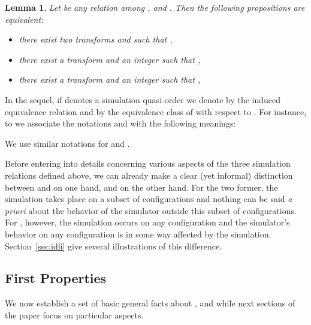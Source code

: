 \documentclass[a4paper]{elsarticle}
\def\qed{\relax\ifmmode\hskip2em \blacksquare\else\unskip\nobreak\hfill\hskip1em \fi}
\newtheorem{lm}{Lemma}[section]
\begin{document}
\begin{lm}
  \label{lem:mapa}
  Let  be any relation among ,  and . Then the following
  propositions are equivalent:
  \begin{itemize}
  \item there exist two  transforms  and  such that
    ,
  \item there exist a  transform  and an integer  such that
    ,
  \item there exist a  transform  and an integer  such that
    ,
  \end{itemize}
\end{lm}
\newcommand\trsfo[1]{\left\langle #1, 0\right\rangle}


In the sequel, if  denotes a simulation quasi-order we denote
by  the induced equivalence relation and by  the
equivalence class of  with respect to . For instance, to
 we associate the notations  and
 with the following meanings:

 We use similar notations for  and
.



Before entering into details concerning various aspects of the three
simulation relations defined above, we can already make a clear (yet
informal) distinction between  and  on one hand,
and  on the other hand. For the two former, the simulation
takes place on a subset of configurations and nothing can be said
\textit{a priori} about the behavior of the simulator outside this
subset of configurations. For , however, the simulation
occurs on any configuration and the simulator's behavior on any
configuration is in some way affected by the
simulation. Section~\ref{sec:idfi} give several illustrations of this
difference.

\subsection{First Properties}
\label{sec:firstprop}

We now establish a set of basic general facts about ,
 and  while next sections of the paper focus on
particular aspects.
\end{document}
